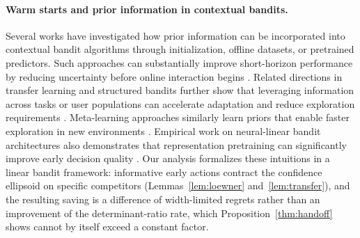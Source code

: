 \documentclass{article}
\theoremstyle{definition}
\theoremstyle{remark}
\theoremstyle{remark}
\begin{document}
\paragraph{Warm starts and prior information in contextual bandits.}
Several works have investigated how prior information can be incorporated
into contextual bandit algorithms through initialization, offline datasets,
or pretrained predictors. Such approaches can substantially improve
short-horizon performance by reducing uncertainty before online interaction
begins \cite{bastani2021mostly,zhang2019warm}. Related directions in
transfer learning and structured bandits further show that leveraging
information across tasks or user populations can accelerate adaptation and
reduce exploration requirements \cite{lazaric2012transfer,gentile2014online}.
Meta-learning approaches similarly learn priors that enable faster
exploration in new environments \cite{sharaf2019meta}. Empirical work on
neural-linear bandit architectures also demonstrates that representation
pretraining can significantly improve early decision quality
\cite{riquelme2018deep}. Our analysis formalizes these intuitions in a
linear bandit framework: informative early actions contract the confidence
ellipsoid on specific competitors (Lemmas~\ref{lem:loewner}
and~\ref{lem:transfer}), and the resulting saving is a difference of
width-limited regrets rather than an improvement of the
determinant-ratio rate, which Proposition~\ref{thm:handoff} shows cannot by
itself exceed a constant factor.
\end{document}
